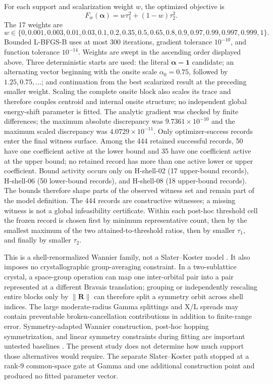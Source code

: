 \documentclass[11pt]{article}
\theoremstyle{definition}
\newcommand{\Rvec}{\mathbf R}
\begin{document}
For each support and scalarization weight $w$, the optimized objective is
\begin{equation}
 F_w(\boldsymbol\alpha)=w\tau_1^2+(1-w)\tau_2^2.
 \label{eq:scalarized-loss}
\end{equation}
The 17 weights are
\begin{equation}
 w\in\{0,0.001,0.003,0.01,0.03,0.1,0.2,0.35,0.5,0.65,
 0.8,0.9,0.97,0.99,0.997,0.999,1\}.
\end{equation}
Bounded L-BFGS-B uses at most 300 iterations, gradient tolerance $10^{-10}$, and
function tolerance $10^{-14}$.  Weights are swept in the ascending order displayed
above.  Three deterministic starts are used: the literal
$\boldsymbol\alpha=\mathbf1$ candidate; an alternating vector beginning with the onsite
scale $\alpha_0=0.75$, followed by $1.25,0.75,\ldots$; and continuation from the best
scalarized result at the preceding smaller weight.  Scaling the complete onsite block
also scales its trace and therefore couples centroid and internal onsite structure; no
independent global energy-shift parameter is fitted.  The analytic gradient was checked by finite
differences; the maximum absolute discrepancy was $9.7361\times10^{-10}$ and the
maximum scaled discrepancy was $4.0729\times10^{-11}$.  Only optimizer-success records enter the final witness surface.  Among the 444 retained
successful records, 50 have one coefficient active at the lower bound and 35 have one
coefficient active at the upper bound; no retained record has more than one active lower
or upper coefficient.  Bound activity occurs only on H-shell-02 (17 upper-bound
records), H-shell-06 (50 lower-bound records), and H-shell-08 (18 upper-bound records).
The bounds therefore shape parts of the observed witness set and remain part of the
model definition.  The 444 records are constructive witnesses; a missing witness is not
a global infeasibility certificate.  Within each post-hoc threshold cell the frozen
record is chosen first by minimum representative count, then by the smallest maximum of
the two attained-to-threshold ratios, then by smaller $\tau_1$, and finally by smaller
$\tau_2$.

This is a shell-renormalized Wannier family, not a Slater--Koster model
\cite{slaterKoster1954,vogl1983}.  It also imposes no crystallographic group-averaging
constraint.  In a two-sublattice crystal, a space-group operation can map one
inter-orbital pair into a pair represented at a different Bravais translation; grouping
or independently rescaling entire blocks only by $\|\Rvec\|$ can therefore split a
symmetry orbit across shell indices.  The large moderate-radius Gamma splittings and
X/L spreads may contain preventable broken-cancellation contributions in addition to
finite-range error.  Symmetry-adapted Wannier construction, post-hoc hopping
symmetrization, and linear symmetry constraints during fitting are important untested
baselines \cite{sakuma2013,gresch2018,zhi2022}.  The present study does not determine how
much support those alternatives would require.  The separate Slater--Koster path stopped
at a rank-9 common-space gate at Gamma and one additional construction point and
produced no fitted parameter vector.
\end{document}
